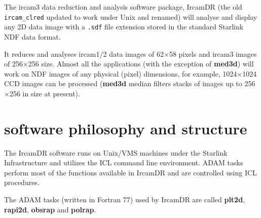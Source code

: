 
The {\sc ircam3} data reduction and analysis software package, {\sc
IrcamDR} (the old {\tt ircam\_clred} updated to work under Unix
and renamed) will analyse and display any 2D data image with a {\tt .sdf}
 file extension stored in the standard Starlink NDF data format.

It reduces and analyses {\sc ircam1/2} data images of 62$\times$58
pixels and {\sc ircam3} images of 256$\times$256 size.  Almost all the
applications (with the exception of {\bf med3d}) will work on NDF
images of any physical (pixel) dimensions, for example,
1024$\times$1024 CCD images can be processed ({\bf med3d} median
filters stacks of images up to 256$\times$256 in size at present).

 \newpage
 \begin{latexonly}
   \setlength{\parskip}{0mm}
   \latexonlytoc
   \setlength{\parskip}{\medskipamount}
 \end{latexonly}
\newpage
\renewcommand{\thepage}{\arabic{page}}
\setcounter{page}{1}

\section{\label{se:soft_structure} software philosophy and structure}

The {\sc IrcamDR} software runs on Unix/VMS machines under the Starlink
Infrastructure and utilizes the ICL command line environment.  {\sc ADAM}
tasks perform most of the functions available in {\sc IrcamDR} and are
controlled using ICL procedures.

The {\sc ADAM} tasks (written in Fortran 77) used by {\sc IrcamDR} are
called {\bf plt2d}, {\bf rapi2d}, {\bf obsrap} and {\bf polrap}.

